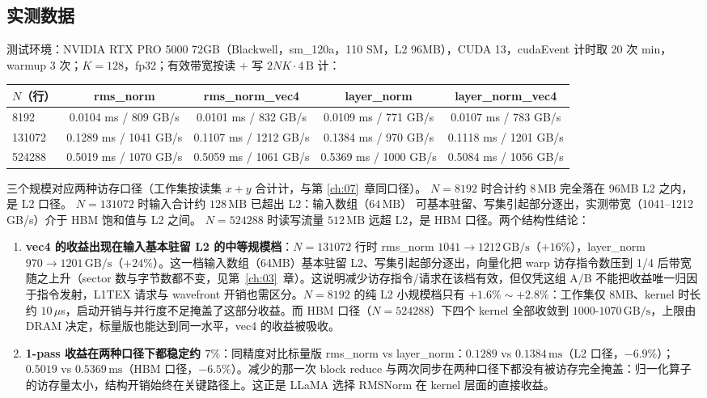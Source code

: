 \subsection{实测数据}

测试环境：NVIDIA RTX PRO 5000 72GB（Blackwell，sm\_120a，110 SM，L2 96MB），CUDA 13，cudaEvent 计时取 20 次 min，warmup 3 次；$K=128$，fp32；有效带宽按读 + 写 $2NK \cdot 4\,\mathrm{B}$ 计：

\begin{center}
\begin{tabular}{lcccc}
\toprule
$N$（行） & rms\_norm & rms\_norm\_vec4 & layer\_norm & layer\_norm\_vec4 \\
\midrule
8192   & 0.0104 ms / 809 GB/s  & 0.0101 ms / 832 GB/s  & 0.0109 ms / 771 GB/s  & 0.0107 ms / 783 GB/s \\
131072 & 0.1289 ms / 1041 GB/s & 0.1107 ms / 1212 GB/s & 0.1384 ms / 970 GB/s  & 0.1118 ms / 1201 GB/s \\
524288 & 0.5019 ms / 1070 GB/s & 0.5059 ms / 1061 GB/s & 0.5369 ms / 1000 GB/s & 0.5084 ms / 1056 GB/s \\
\bottomrule
\end{tabular}
\end{center}

三个规模对应两种访存口径（工作集按读集 $x+y$ 合计计，与第 \ref{ch:07}~章同口径）。
$N = 8192$ 时合计约 $8\,\mathrm{MB}$ 完全落在 96MB L2 之内，是 L2 口径。
$N = 131072$ 时输入合计约 $128\,\mathrm{MB}$ 已超出 L2：输入数组（$64\,\mathrm{MB}$）
可基本驻留、写集引起部分逐出，实测带宽（1041--1212 GB/s）介于 HBM 饱和值与 L2 之间。
$N = 524288$ 时读写流量 $512\,\mathrm{MB}$ 远超 L2，是 HBM 口径。两个结构性结论：

\begin{enumerate}
  \item \textbf{vec4 的收益出现在输入基本驻留 L2 的中等规模档}：$N = 131072$ 行时 rms\_norm $1041 \to 1212\,\mathrm{GB/s}$（$+16\%$），layer\_norm $970 \to 1201\,\mathrm{GB/s}$（$+24\%$）。这一档输入数组（64MB）基本驻留 L2、写集引起部分逐出，向量化把 warp 访存指令数压到 1/4 后带宽随之上升（sector 数与字节数都不变，见第~\ref{ch:03}~章）。这说明减少访存指令/请求在该档有效，但仅凭这组 A/B 不能把收益唯一归因于指令发射，L1TEX 请求与 wavefront 开销也需区分。$N = 8192$ 的纯 L2 小规模档只有 $+1.6\%\sim+2.8\%$：工作集仅 8MB、kernel 时长约 $10\,\mu$s，启动开销与并行度不足掩盖了这部分收益。而 HBM 口径（$N = 524288$）下四个 kernel 全部收敛到 $1000\text{-}1070\,\mathrm{GB/s}$，上限由 DRAM 决定，标量版也能达到同一水平，vec4 的收益被吸收。
  \item \textbf{1-pass 收益在两种口径下都稳定约 $7\%$}：同精度对比标量版 rms\_norm vs layer\_norm：$0.1289$ vs $0.1384\,\mathrm{ms}$（L2 口径，$-6.9\%$）；$0.5019$ vs $0.5369\,\mathrm{ms}$（HBM 口径，$-6.5\%$）。减少的那一次 block reduce 与两次同步在两种口径下都没有被访存完全掩盖：归一化算子的访存量太小，结构开销始终在关键路径上。这正是 LLaMA 选择 RMSNorm 在 kernel 层面的直接收益。
\end{enumerate}

